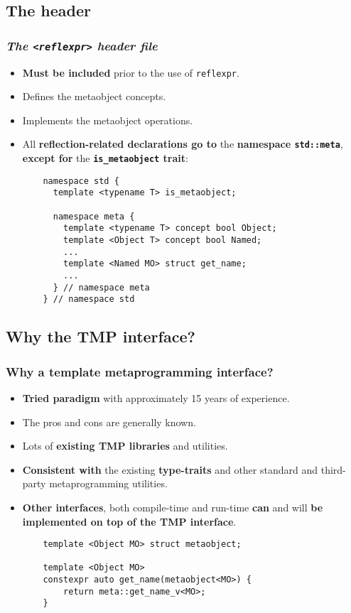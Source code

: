 \documentclass[compress,table,xcolor=table]{beamer}
\begin{document}
\subsection{The header}
\begin{frame}[fragile]
\frametitle{\em The \texttt{<reflexpr>} header file}
  \begin{itemize}
    \item \textbf{Must be included} prior to the use of \texttt{reflexpr}.
    \item Defines the metaobject concepts.
    \item Implements the metaobject operations.
    \item All \textbf{reflection-related declarations go to} the \textbf{namespace
    \texttt{std::meta}}, \textbf{except for} the \textbf{\texttt{is\_metaobject} trait}:
    \begin{lstlisting}
	namespace std {
	  template <typename T> is_metaobject;

	  namespace meta {
	    template <typename T> concept bool Object;
	    template <Object T> concept bool Named;
	    ...
	    template <Named MO> struct get_name;
	    ...
	  } // namespace meta
	} // namespace std
    \end{lstlisting}
  \end{itemize}
\end{frame}

\subsection{Why the TMP interface?}
\begin{frame}[fragile]
\frametitle{Why a template metaprogramming interface?}
  \large
  \begin{itemize}
    \item \textbf{Tried paradigm} with approximately 15 years of experience.
    \item The pros and cons are generally known.
    \item Lots of \textbf{existing TMP libraries} and utilities.
    \item \textbf{Consistent with} the existing \textbf{type-traits} and other
      standard and third-party metaprogramming utilities.
    \item \textbf{Other interfaces}, both compile-time and run-time \textbf{can}
      and will \textbf{be implemented on top of the TMP interface}.
    \begin{lstlisting}
	template <Object MO> struct metaobject;

	template <Object MO>
	constexpr auto get_name(metaobject<MO>) {
	    return meta::get_name_v<MO>;
	}
    \end{lstlisting}
  \end{itemize}
\end{frame}
\end{document}
